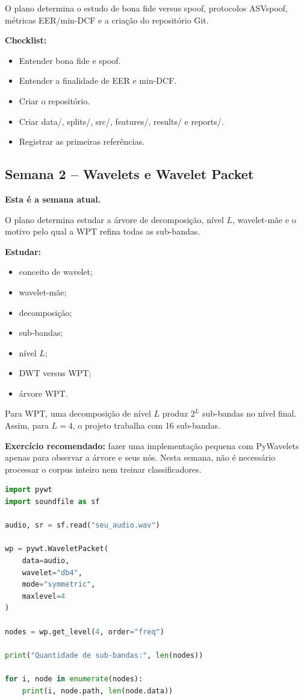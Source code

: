 \documentclass[12pt,a4paper]{article}
\begin{document}
O plano determina o estudo de bona fide versus spoof, protocolos ASVspoof, métricas EER/min-DCF e a criação do repositório Git.

\textbf{Checklist:}
\begin{itemize}[label=$\square$]
\item Entender bona fide e spoof.
\item Entender a finalidade de EER e min-DCF.
\item Criar o repositório.
\item Criar data/, splits/, src/, features/, results/ e reports/.
\item Registrar as primeiras referências.
\end{itemize}

\subsection{Semana 2 -- Wavelets e Wavelet Packet}

\textbf{Esta é a semana atual.}

O plano determina estudar a árvore de decomposição, nível $L$, wavelet-mãe e o motivo pelo qual a WPT refina todas as sub-bandas.

\textbf{Estudar:}
\begin{itemize}
\item conceito de wavelet;
\item wavelet-mãe;
\item decomposição;
\item sub-bandas;
\item nível $L$;
\item DWT versus WPT;
\item árvore WPT.
\end{itemize}

Para WPT, uma decomposição de nível $L$ produz $2^L$ sub-bandas no nível final. Assim, para $L=4$, o projeto trabalha com 16 sub-bandas.

\textbf{Exercício recomendado:} fazer uma implementação pequena com PyWavelets apenas para observar a árvore e seus nós. Nesta semana, não é necessário processar o corpus inteiro nem treinar classificadores.

\begin{lstlisting}[language=Python]
import pywt
import soundfile as sf

audio, sr = sf.read("seu_audio.wav")

wp = pywt.WaveletPacket(
    data=audio,
    wavelet="db4",
    mode="symmetric",
    maxlevel=4
)

nodes = wp.get_level(4, order="freq")

print("Quantidade de sub-bandas:", len(nodes))

for i, node in enumerate(nodes):
    print(i, node.path, len(node.data))
\end{lstlisting}
\end{document}
